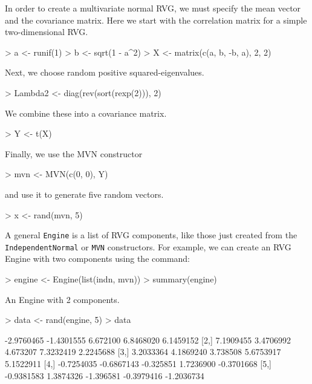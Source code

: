 \documentclass[11pt]{article}
\def\rcode#1{\texttt{#1}}
\begin{document}
In order to create a multivariate normal RVG, we must specify the mean
vector and the covariance matrix.  Here we start with the correlation
matrix for a simple two-dimensional RVG.
\begin{Schunk}
\begin{Sinput}
> a <- runif(1)
> b <- sqrt(1 - a^2)
> X <- matrix(c(a, b, -b, a), 2, 2)
\end{Sinput}
\end{Schunk}
Next, we choose random positive squared-eigenvalues.
\begin{Schunk}
\begin{Sinput}
> Lambda2 <- diag(rev(sort(rexp(2))), 2)
\end{Sinput}
\end{Schunk}
We combine these into a covariance matrix.
\begin{Schunk}
\begin{Sinput}
> Y <- t(X) %*% Lambda2 %*% X
\end{Sinput}
\end{Schunk}
Finally, we use the MVN constructor
\begin{Schunk}
\begin{Sinput}
> mvn <- MVN(c(0, 0), Y)
\end{Sinput}
\end{Schunk}
and use it to generate five random vectors.
\begin{Schunk}
\begin{Sinput}
> x <- rand(mvn, 5)
\end{Sinput}
\end{Schunk}

A general \rcode{Engine} is a list of RVG components, like those just
created from the \rcode{IndependentNormal} or \rcode{MVN}
constructors.  For example, we can create an RVG Engine with two
components using the command:
\begin{Schunk}
\begin{Sinput}
> engine <- Engine(list(indn, mvn))
> summary(engine)
\end{Sinput}
\begin{Soutput}
An Engine with 2 components.
\end{Soutput}
\end{Schunk}
\begin{Schunk}
\begin{Sinput}
> data <- rand(engine, 5)
> data
\end{Sinput}
\begin{Soutput}
           [,1]       [,2]      [,3]       [,4]       [,5]
[1,] -2.9760465 -1.4301555  6.672100  6.8468020  6.1459152
[2,]  7.1909455  3.4706992  4.673207  7.3232419  2.2245688
[3,]  3.2033364  4.1869240  3.738508  5.6753917  5.1522911
[4,] -0.7254035 -0.6867143 -0.325851  1.7236900 -0.3701668
[5,] -0.9381583  1.3874326 -1.396581 -0.3979416 -1.2036734
\end{Soutput}
\end{Schunk}
\end{document}

